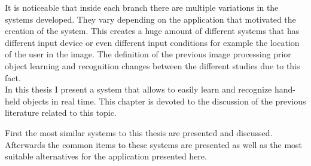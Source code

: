 It is noticeable that inside each branch there are multiple variations in the systems developed. 
They vary depending on the application that motivated the creation of the system. 
This creates a huge amount of different systems that has different input device or even different input conditions for example the location of the user in the image. 
The definition of the previous image processing prior object learning and recognition changes between the different studies due to this fact.
\\


In this thesis I present a system that allows to easily learn and recognize hand-held objects in real time. 
This chapter is devoted to the discussion of the previous literature related to this topic. 

First the most similar systems to this thesis are presented and discussed. 
Afterwards the common items to these systems are presented as well as the most suitable alternatives for the application presented here. 


